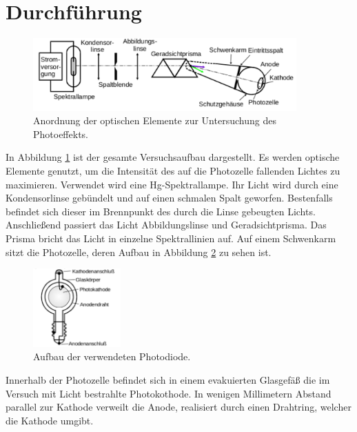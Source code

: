 \section{Durchf\"uhrung}
\label{sec:Durchfuehrung}

\begin{figure}
	\centering
	\includegraphics[width=0.9\textwidth]{Bilder/Aufbau.pdf}
	\caption{Anordnung der optischen Elemente zur Untersuchung des Photoeffekts.\cite{skript}}
	\label{fig:Aufbau}
\end{figure}
In Abbildung \ref{fig:Aufbau} ist der gesamte Versuchsaufbau dargestellt. 
Es werden optische Elemente genutzt, um die Intensität des auf die Photozelle fallenden Lichtes zu maximieren. 
Verwendet wird eine Hg-Spektrallampe.
Ihr Licht wird durch eine Kondensorlinse gebündelt und auf einen schmalen Spalt geworfen. 
Bestenfalls befindet sich dieser im Brennpunkt des durch die Linse gebeugten Lichts.
Anschließend passiert das Licht Abbildungslinse und Geradsichtprisma. 
Das Prisma bricht das Licht in einzelne Spektrallinien auf. 
Auf einem Schwenkarm sitzt die Photozelle, deren Aufbau in Abbildung \ref{fig:Photozelle} zu sehen ist. 
\begin{figure}[H]
	\centering
	\includegraphics[width=0.3\textwidth]{Bilder/Schema_Photozelle.pdf}
	\caption{Aufbau der verwendeten Photodiode. \cite{skript}}
	\label{fig:Photozelle}
\end{figure}

Innerhalb der Photozelle befindet sich in einem evakuierten Glasgefäß die im Versuch mit Licht bestrahlte Photokothode. 
In wenigen Millimetern Abstand parallel zur Kathode verweilt die Anode, realisiert durch einen Drahtring, welcher die Kathode umgibt. 

